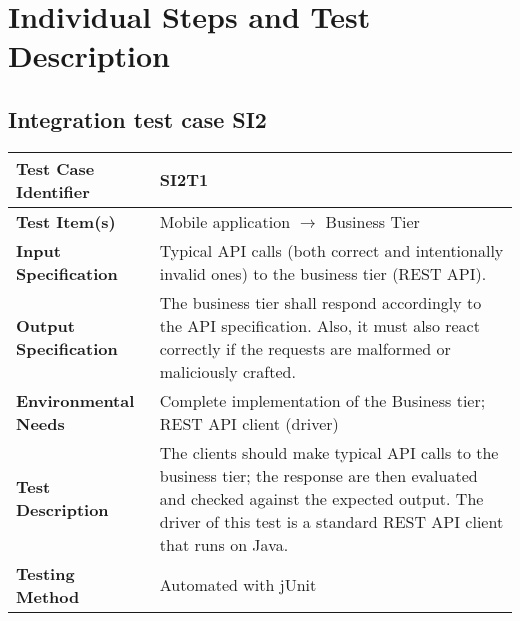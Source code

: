 \chapter{Individual Steps and Test Description}
\label{chap:individual-steps}

\section{Integration test case SI2}

\begin{tabular}{l p{}}
    \hline
    \textbf{Test Case Identifier} & SI2T1\\
    \hline
    \textbf{Test Item(s)} & Mobile application $\rightarrow$ Business Tier\\
    \hline
    \textbf{Input Specification} & Typical API calls (both correct and intentionally invalid ones) to the business tier (REST API).\\
    \hline
    \textbf{Output Specification} & The business tier shall respond accordingly to the API specification. Also, it must also react correctly if the requests are malformed or maliciously crafted.\\
    \hline
    \textbf{Environmental Needs} & Complete implementation of the Business tier; REST API client (driver)\\
    \hline
    \textbf{Test Description} & The clients should make typical API calls to the business tier; the response are then evaluated and checked against the expected output. The driver of this test is a standard REST API client that runs on Java.\\
    \hline
    \textbf{Testing Method} & Automated with jUnit \\
    \hline
\end{tabular}

\vspace{2em}

